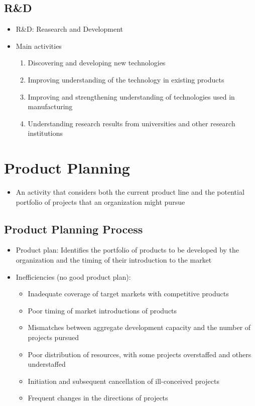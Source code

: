 \documentclass[openany,12pt,a4paper]{book}
\begin{document}
\section{R\&D}
\begin{itemize}
    \item R\&D: Reasearch and Development
    \item Main activities
    \begin{enumerate}
        \item Discovering and developing new technologies
        \item Improving understanding of the technology in existing products
        \item Improving and strengthening understanding of technologies used in manufacturing
        \item Understanding research results from universities and other research institutions
    \end{enumerate}
\end{itemize}

\chapter{Product Planning}
\begin{itemize}
    \item An activity that considers both the current product line and the potential portfolio of projects that an organization might pursue
\end{itemize}
\section{Product Planning Process}
\begin{itemize}
    \item Product plan: Identifies the portfolio of products to be developed by the organization and the timing of their introduction to the market
    \item Inefficiencies (no good product plan):
    \begin{itemize}
        \item Inadequate coverage of target markets with competitive products
        \item Poor timing of market introductions of products
        \item Mismatches between aggregate development capacity and the number of projects pursued
        \item Poor distribution of resources, with some projects overstaffed and others understaffed
        \item Initiation and subsequent cancellation of ill-conceived projects
        \item Frequent changes in the directions of projects
    \end{itemize}
\end{itemize}
\end{document}
